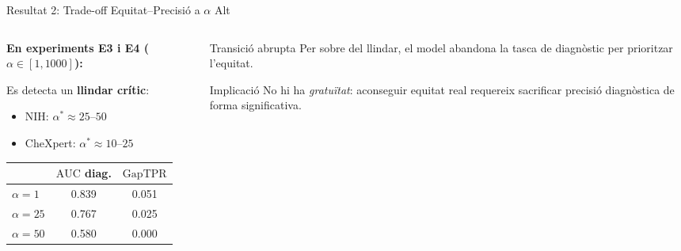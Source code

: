\documentclass[aspectratio=169,12pt]{beamer}
\newcommand{\gap}{\ensuremath{\mathrm{GapTPR}}}
\newcommand{\auc}{\ensuremath{\mathrm{AUC}}}
\begin{document}
\begin{frame}{Resultat 2: Trade-off Equitat–Precisió a $\alpha$ Alt}
  \begin{columns}[T]
    \begin{column}{0.55\textwidth}
      \textbf{En experiments E3 i E4 ($\alpha \in [1, 1000]$):}

      \smallskip
      Es detecta un \textbf{llindar crític}:
      \begin{itemize}
        \item NIH: $\alpha^* \approx 25$--$50$
        \item CheXpert: $\alpha^* \approx 10$--$25$
      \end{itemize}

      \vspace{0.3em}
      \begin{tabular}{lcc}
        \toprule
        & $\auc$ diag. & $\gap$ \\
        \midrule
        $\alpha = 1$   & 0.839 & 0.051 \\
        $\alpha = 25$  & 0.767 & 0.025 \\
        $\alpha = 50$  & 0.580 & 0.000 \\
        \bottomrule
      \end{tabular}
      \par\vspace{0.2em}{\footnotesize (NIH ChestX-ray, $ls = 2$)}
    \end{column}
    \begin{column}{0.42\textwidth}
      \begin{alertblock}{Transició abrupta}
        Per sobre del llindar, el model \alert{abandona} la tasca de diagnòstic per prioritzar l'equitat.
      \end{alertblock}

      \vspace{0.5em}
      \begin{block}{Implicació}
        No hi ha \emph{gratuïtat}: aconseguir equitat real requereix sacrificar precisió diagnòstica de forma significativa.
      \end{block}
    \end{column}
  \end{columns}
\end{frame}
\end{document}
